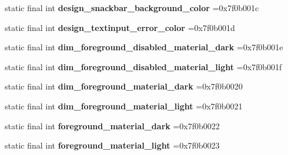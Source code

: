 \begin{DoxyCompactItemize}
\item 
\hypertarget{classcheck_1_1test_1_1_r_1_1color_ae5290891d0685f664e2fa8af476bd36e}{}static final int {\bfseries design\+\_\+snackbar\+\_\+background\+\_\+color} =0x7f0b001c\label{classcheck_1_1test_1_1_r_1_1color_ae5290891d0685f664e2fa8af476bd36e}

\item 
\hypertarget{classcheck_1_1test_1_1_r_1_1color_ad77e2a5eff5f36eb2f49544587b87ab1}{}static final int {\bfseries design\+\_\+textinput\+\_\+error\+\_\+color} =0x7f0b001d\label{classcheck_1_1test_1_1_r_1_1color_ad77e2a5eff5f36eb2f49544587b87ab1}

\item 
\hypertarget{classcheck_1_1test_1_1_r_1_1color_a4117947ba52b43e3f1540a6fff819e79}{}static final int {\bfseries dim\+\_\+foreground\+\_\+disabled\+\_\+material\+\_\+dark} =0x7f0b001e\label{classcheck_1_1test_1_1_r_1_1color_a4117947ba52b43e3f1540a6fff819e79}

\item 
\hypertarget{classcheck_1_1test_1_1_r_1_1color_a607790b42d7a26dcacf95df19a308f7d}{}static final int {\bfseries dim\+\_\+foreground\+\_\+disabled\+\_\+material\+\_\+light} =0x7f0b001f\label{classcheck_1_1test_1_1_r_1_1color_a607790b42d7a26dcacf95df19a308f7d}

\item 
\hypertarget{classcheck_1_1test_1_1_r_1_1color_a128a5b5a1aeeaf6ccaf8b2f450b12928}{}static final int {\bfseries dim\+\_\+foreground\+\_\+material\+\_\+dark} =0x7f0b0020\label{classcheck_1_1test_1_1_r_1_1color_a128a5b5a1aeeaf6ccaf8b2f450b12928}

\item 
\hypertarget{classcheck_1_1test_1_1_r_1_1color_a32b5ff15db8019b55fb8e96cf6c9d7de}{}static final int {\bfseries dim\+\_\+foreground\+\_\+material\+\_\+light} =0x7f0b0021\label{classcheck_1_1test_1_1_r_1_1color_a32b5ff15db8019b55fb8e96cf6c9d7de}

\item 
\hypertarget{classcheck_1_1test_1_1_r_1_1color_a2f903839e0bf23e43fcc6bea46dc070b}{}static final int {\bfseries foreground\+\_\+material\+\_\+dark} =0x7f0b0022\label{classcheck_1_1test_1_1_r_1_1color_a2f903839e0bf23e43fcc6bea46dc070b}

\item 
\hypertarget{classcheck_1_1test_1_1_r_1_1color_a416397f87beb4656aeca966d7730b7fc}{}static final int {\bfseries foreground\+\_\+material\+\_\+light} =0x7f0b0023\label{classcheck_1_1test_1_1_r_1_1color_a416397f87beb4656aeca966d7730b7fc}


\end{DoxyCompactItemize}
